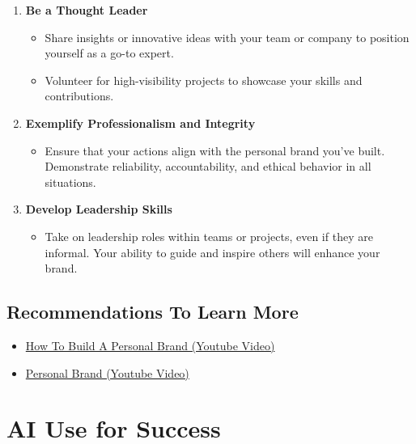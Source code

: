 \documentclass[
  letterpaper,
  DIV=11,
  numbers=noendperiod]{scrreprt}
\providecommand{\tightlist}{%
  \setlength{\itemsep}{0pt}\setlength{\parskip}{0pt}}\usepackage{longtable,booktabs,array}
\begin{document}
\begin{enumerate}
\def\labelenumi{\arabic{enumi}.}
\item
  \textbf{Be a Thought Leader}

  \begin{itemize}
  \tightlist
  \item
    Share insights or innovative ideas with your team or company to
    position yourself as a go-to expert.
  \item
    Volunteer for high-visibility projects to showcase your skills and
    contributions.
  \end{itemize}
\item
  \textbf{Exemplify Professionalism and Integrity}

  \begin{itemize}
  \tightlist
  \item
    Ensure that your actions align with the personal brand you've built.
    Demonstrate reliability, accountability, and ethical behavior in all
    situations.
  \end{itemize}
\item
  \textbf{Develop Leadership Skills}

  \begin{itemize}
  \tightlist
  \item
    Take on leadership roles within teams or projects, even if they are
    informal. Your ability to guide and inspire others will enhance your
    brand.
  \end{itemize}
\end{enumerate}

\section{Recommendations To Learn
More}\label{recommendations-to-learn-more-4}

\begin{itemize}
\tightlist
\item
  \href{https://www.youtube.com/watch?v=1kUCm1JPzxg&pp=ygURcGVyc29uYWwgYnJhbmRpbmc\%3D}{How
  To Build A Personal Brand (Youtube Video)}
\item
  \href{https://www.youtube.com/watch?v=ozMCb0wOnMU}{Personal Brand
  (Youtube Video)}
\end{itemize}


\chapter{AI Use for Success}\label{ai-use-for-success}
\end{document}
